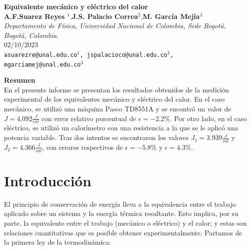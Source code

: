 \documentclass{article}
\date{}
\begin{document}
 
     \begin{center}
        {\Large \textbf{Equivalente mecánico y eléctrico del calor}}\\
        \vspace{5mm}
        {\small \textbf{A.F.Suarez Reyes $^{1}$},\textbf{J.S. Palacio Correa$^{2}$},\textbf{M. García Mejía$^{3}$} \\
        \vspace{3mm}}
        {\small \textit{Departamento de Física, Universidad Nacional de Colombia, Sede Bogotá, Bogotá, Colombia.}}\\
        \vspace{3mm}
        {\small 02/10/2023}\\
        \vspace{3mm}
        {\texttt{\textup{asuarezre@unal.edu.co$^{1}$, jspalacioco@unal.edu.co$^2$, mgarciamej@unal.edu.co$^{3}$}}} \\
    \end{center}
    
    
    \vspace{5mm}

{\large \textbf{Resumen}}\\
En el presente informe se presentan los resultados obtenidos de la medición experimental de los equivalentes mecánico y eléctrico del calor. En el caso mecánico, se utilizó una máquina Pasco TD8551A y se encontró un valor de $J = 4.092 \frac{J}{cal}$ con error relativo porcentual de $\epsilon = -2.2\%$. Por otro lado, en el caso eléctrico, se utilizó un calorímetro con una resistencia a la que se le aplicó una potencia variable. Tras dos intentos se encontraron los valores $J_1 = 3.939 \frac{J}{cal}$ y $J_2 = 4.366 \frac{J}{cal}$, con errores respectivos de $\epsilon = -5.8\%$ y $\epsilon = 4.3\%$.

\textit{ \hspace{2mm}}

\section{Introducción}
El principio de conservación de energía lleva a la equivalencia entre el trabajo aplicado sobre un sistema y la energía térmica resultante. Esto implica, por su parte, la equivalente entre el trabajo (mecánico o eléctrico) y el calor; y estas son relaciones cuantitativas que es posible obtener experimentalmente. Partamos de la primera ley de la termodinámica:
\end{document}
